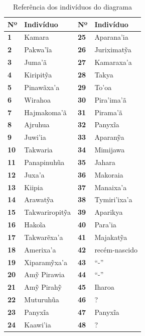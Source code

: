 \begin{table}[H]
\centering
\caption{Referência dos indivíduos do diagrama}
\label{my-label}
\begin{tabular}{|l|l|l|l|}
\hline
\textbf{Nº} & \textbf{Indivíduo} & \textbf{Nº} & \textbf{Indivíduo} \\ \hline
\textbf{1}  & Kamara             & \textbf{25} & Aparana'ia         \\ \hline
\textbf{2}  & Pakwa'ĩa           & \textbf{26} & Juriximatỹa       \\ \hline
\textbf{3}  & Juma'ã             & \textbf{27} & Kamaraxa’a         \\ \hline
\textbf{4}  & Kiripitỹa         & \textbf{28} & Takya              \\ \hline
\textbf{5}  & Pinawãxa'a         & \textbf{29} & To'oa              \\ \hline
\textbf{6}  & Wirahoa            & \textbf{30} & Pira’ima'ã         \\ \hline
\textbf{7}  & Hajmakoma'ã        & \textbf{31} & Pirama'ã           \\ \hline
\textbf{8}  & Ajruhua            & \textbf{32} & Panyxĩa           \\ \hline
\textbf{9}  & Juwi'ia            & \textbf{33} & Aparanỹa          \\ \hline
\textbf{10} & Takwaria           & \textbf{34} & Mimijawa           \\ \hline
\textbf{11} & Panapinuhũa       & \textbf{35} & Jahara             \\ \hline
\textbf{12} & Juxa'a             & \textbf{36} & Makoraia           \\ \hline
\textbf{13} & Kiipia             & \textbf{37} & Manaixa'a          \\ \hline
\textbf{14} & Arawatỹa          & \textbf{38} & Tymiri'ixa'a       \\ \hline
\textbf{15} & Takwariropitỹa    & \textbf{39} & Aparikya           \\ \hline
\textbf{16} & Hakoĩa            & \textbf{40} & Para'ia            \\ \hline
\textbf{17} & Takwarẽxa’a       & \textbf{41} & Majakatỹa         \\ \hline
\textbf{18} & Amerixa’a          & \textbf{42} & recém-nascido      \\ \hline
\textbf{19} & Xiparamỹxa’a      & \textbf{43} & ``-''                \\ \hline
\textbf{20} & Amỹ Pirawia       & \textbf{44} & ``-''                \\ \hline
\textbf{21} & Amỹ Pirahỹ       & \textbf{45} & Iharoa             \\ \hline
\textbf{22} & Muturuhũa         & \textbf{46} & ?                  \\ \hline
\textbf{23} & Panyxĩa           & \textbf{47} & Panyxĩa           \\ \hline
\textbf{24} & Kaawi'ia           & \textbf{48} & ?                  \\ \hline
\end{tabular}
\end{table}

